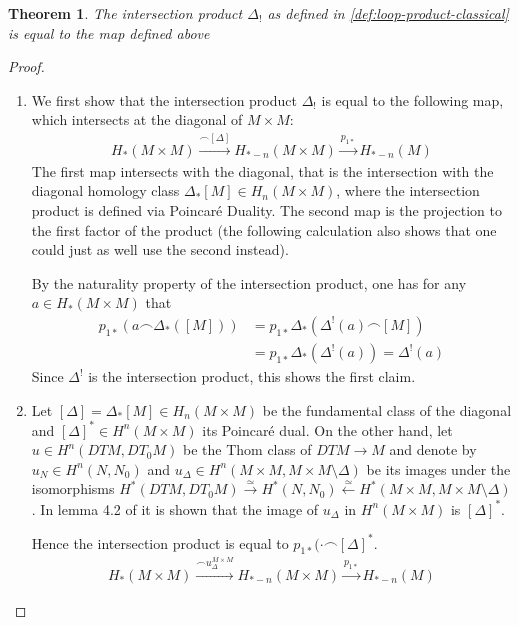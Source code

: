 \documentclass{scrartcl}
\theoremstyle{plain}
\newtheorem{theorem}{Theorem}[section]
\theoremstyle{definition}
\newcommand{\capp}{\mathbin{\frown}}
\newcommand{\quiso}{\simeq}
\let\xto\xrightarrow
\let\xfrom\xleftarrow
\begin{document}
\begin{theorem}\label{thm:intersection_product_tubular}
    The intersection product $\Delta_!$ as defined in \cref{def:loop-product-classical} is equal to the map defined above
\end{theorem}
\begin{proof}
    \begin{enumerate}
        \item We first show that the intersection product $\Delta_!$ is equal to the following map, which intersects at the diagonal of $M\times M$: 
        \begin{align*}
            H_*(M\times M) \xrightarrow{\capp [\Delta]} H_{*-n}(M\times M) \xrightarrow{p_{1*}} H_{*-n}(M)
        \end{align*}
        The first map intersects with the diagonal, that is the intersection with the diagonal homology class $\Delta_*[M]\in H_n(M\times M)$, where the intersection product is defined via Poincaré Duality. The second map is the projection to the first factor of the product (the following calculation also shows that one could just as well use the second instead).

        By the naturality property of the intersection product, one has for any $a\in H_*(M\times M)$ that
        \begin{align*}
            p_{1*}(a \capp \Delta_*([M])) &= p_{1*}\Delta_*(\Delta^!(a) \capp [M]) \\
            &= p_{1*}\Delta_*(\Delta^!(a)) = \Delta^!(a)
        \end{align*}
        Since $\Delta^!$ is the intersection product, this shows the first claim.

        \item Let $[\Delta] = \Delta_*[M]\in H_n(M\times M)$ be the fundamental class of the diagonal and $[\Delta]^*\in H^n(M\times M)$ its Poincaré dual. On the other hand, let $u\in H^n(DTM, DT_0M)$ be the Thom class of $DTM\to M$ and denote by $u_N\in H^n(N, N_0)$ and $u_{\Delta}\in H^n(M\times M, M\times M\setminus\Delta)$ be its images under the isomorphisms $H^*(DTM, DT_0M) \xto{\quiso} H^*(N, N_0) \xfrom{\quiso} H^*(M\times M, M\times M\setminus\Delta)$. In lemma 4.2 of \cite{hutchings2011cup} it is shown that the image of $u_\Delta$ in $H^n(M\times M)$ is $[\Delta]^*$.

        Hence the intersection product is equal to $p_{1*}(\cdot \capp [\Delta]^*$. 
        \begin{align*}
            H_*(M\times M) \xrightarrow{\capp u^{M\times M}_\Delta} H_{*-n}(M\times M) \xrightarrow{p_{1*}} H_{*-n}(M)
        \end{align*}
            


\end{enumerate}
\end{proof}
\end{document}
